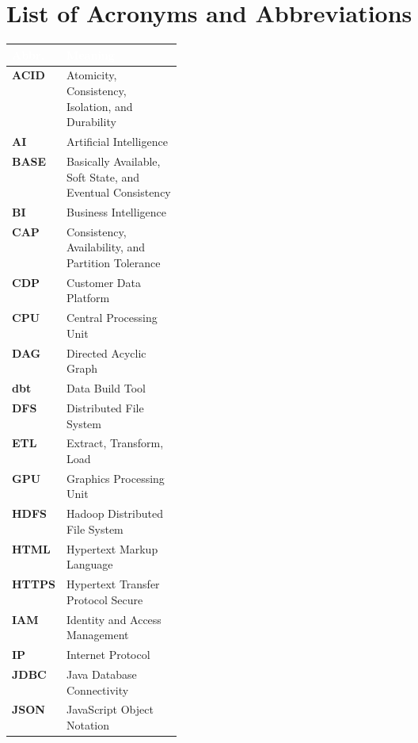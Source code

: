 \chapter*{List of Acronyms and Abbreviations}
{}

\begingroup
\footnotesize
\renewcommand{\arraystretch}{1.08}

\begin{minipage}[t]{0.49\textwidth}
\vspace{0pt}
\begin{tabularx}{\linewidth}{|L{0.25\linewidth}|Y|}
\hline
{}
\textcolor{white}{\textbf{Abbr.}} & \textcolor{white}{\textbf{Meaning}} \\
\hline
\textbf{ACID} & Atomicity, Consistency, Isolation, and Durability \\
\textbf{AI} & Artificial Intelligence \\
\textbf{BASE} & Basically Available, Soft State, and Eventual Consistency \\
\textbf{BI} & Business Intelligence \\
\textbf{CAP} & Consistency, Availability, and Partition Tolerance \\
\textbf{CDP} & Customer Data Platform \\
\textbf{CPU} & Central Processing Unit \\
\textbf{DAG} & Directed Acyclic Graph \\
\textbf{dbt} & Data Build Tool \\
\textbf{DFS} & Distributed File System \\
\textbf{ETL} & Extract, Transform, Load \\
\textbf{GPU} & Graphics Processing Unit \\
\textbf{HDFS} & Hadoop Distributed File System \\
\textbf{HTML} & Hypertext Markup Language \\
\textbf{HTTPS} & Hypertext Transfer Protocol Secure \\
\textbf{IAM} & Identity and Access Management \\
\textbf{IP} & Internet Protocol \\
\textbf{JDBC} & Java Database Connectivity \\
\textbf{JSON} & JavaScript Object Notation \\
\hline
\end{tabularx}
\end{minipage}
